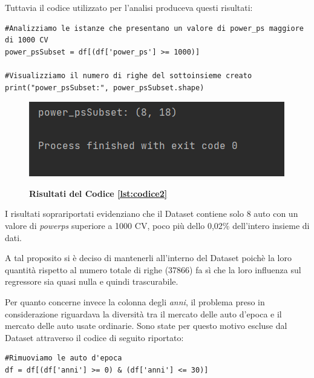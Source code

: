 Tuttavia il codice utilizzato per l'analisi produceva questi risultati:
\bigskip
\lstset{language=Python}
\lstset{frame=lines}
\lstset{basicstyle=\footnotesize}
\lstset{columns=fullflexible}
\begin{lstlisting}
#Analizziamo le istanze che presentano un valore di power_ps maggiore di 1000 CV
power_psSubset = df[(df['power_ps'] >= 1000)]

#Visualizziamo il numero di righe del sottoinsieme creato
print("power_psSubset:", power_psSubset.shape)
\end{lstlisting}

\begin{figure}
    \centering
    \caption{\textbf{Risultati del Codice \ref{lst:codice2}}}
    \includegraphics{Immagini/RisCodice2.png}
    \label{fig:my_label}
\end{figure}

I risultati soprariportati evidenziano che il Dataset contiene solo 8 auto con un valore di \textit{power\textunderscore ps} superiore a 1000 CV, poco più dello 0,02\% dell'intero insieme di dati. 

A tal proposito si è deciso di mantenerli all'interno del Dataset poichè la loro quantità rispetto al numero totale di righe (37866) fa sì che la loro influenza sul regressore sia quasi nulla e quindi trascurabile.

Per quanto concerne invece la colonna degli \textit{anni}, il problema preso in considerazione riguardava la diversità tra il mercato delle auto d'epoca e il mercato delle auto usate ordinarie. Sono state per questo motivo escluse dal Dataset attraverso il codice di seguito riportato:

\lstset{language=Python}
\lstset{frame=lines}
\lstset{basicstyle=\footnotesize}
\lstset{columns=fullflexible}
\begin{lstlisting}
#Rimuoviamo le auto d'epoca
df = df[(df['anni'] >= 0) & (df['anni'] <= 30)]
\end{lstlisting}
\bigskip


